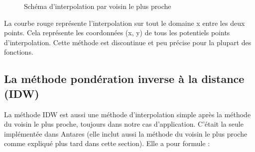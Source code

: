 \begin{figure}[H]
    \centering
    \caption{Schéma d'interpolation par voisin le plus proche}
    \label{fig:interpolation_voisin}
\end{figure}

La courbe rouge représente l'interpolation sur tout le domaine x entre les deux points. Cela représente les coordonnées (x, y) de tous les potentiels points d'interpolation.
Cette méthode est discontinue et peu précise pour la plupart des fonctions.



\subsection{La méthode pondération inverse à la distance (IDW)}\label{sIDW} %

La méthode IDW est aussi une méthode d'interpolation simple après la méthode du voisin le plus proche, toujours dans notre cas d'application. C'était la seule implémentée dans Antares (elle inclut aussi la méthode du voisin le plus proche comme expliqué plus tard dans cette section). Elle a pour formule :


